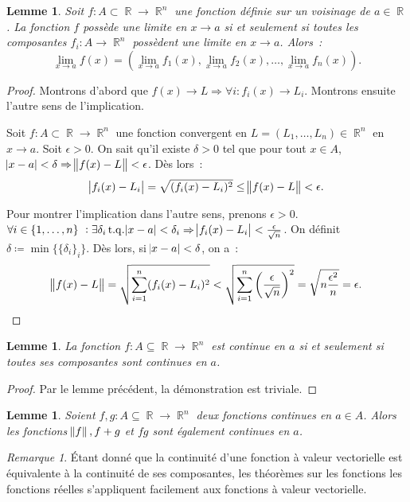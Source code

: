 \documentclass{article}
\DeclareMathOperator{\R}{\mathbb R}
\DeclareMathOperator{\tq}{ t.q. }
\newtheorem{lem}[thm]{Lemme}
\theoremstyle{definition}
\theoremstyle{remark}
\newtheorem*{rmq}{Remarque}
\begin{document}
		\begin{lem} Soit $f : A \subset \R \to \R^n$ une fonction définie sur un voisinage de $a \in \R$. La fonction $f$ possède une limite en $x \to a$ si
		et seulement si toutes les composantes $f_i : A \to \R^n$ possèdent une limite en $x \to a$. Alors~:
		\[\lim_{x \to a}f(x) = \left(\lim_{x \to a}f_1(x), \lim_{x \to a}f_2(x), \ldots, \lim_{x \to a}f_n(x)\right).\]
		\end{lem}

		\begin{proof} Montrons d'abord que $f(x) \to L \Rightarrow \forall i : f_i(x) \to L_i$. Montrons ensuite l'autre sens de l'implication.

		Soit $f : A \subset \R \to \R^n$ une fonction convergent en $L = (L_1, \ldots, L_n) \in \R^n$ en $x \to a$. Soit $\epsilon > 0$. On sait qu'il existe
		$\delta > 0$ tel que pour tout $x \in A$, $\abs{x-a} < \delta \Rightarrow \norm{f(x)-L} < \epsilon$. Dès lors~:
		\[\abs{f_i(x) - L_i} = \sqrt {(f_i(x) - L_i)^2} \leq \norm {f(x)-L} < \epsilon.\]

		Pour montrer l'implication dans l'autre sens, prenons $\epsilon > 0$. $\forall i \in \{1, \ldots, n\}~:
		\exists \delta_i \tq \abs{x-a} < \delta_i \Rightarrow \abs{f_i(x)-L_i} < \frac \epsilon{\sqrt n}$. On définit $\delta \coloneqq \min\{\{\delta_i\}_i\}$.
		Dès lors, si $\abs{x-a} < \delta$, on a~:
		\[\norm {f(x)-L} = \sqrt {\sum_{i=1}^n(f_i(x)-L_i)^2} < \sqrt {\sum_{i=1}^n\left(\frac \epsilon{\sqrt n}\right)^2} = \sqrt {n\frac {\epsilon^2}{n}} = \epsilon.\]
		\end{proof}

		\begin{lem} La fonction $f : A \subseteq \R \to \R^n$ est continue en $a$ si et seulement si toutes ses composantes sont continues en $a$. \end{lem}

		\begin{proof} Par le lemme précédent, la démonstration est triviale. \end{proof}

		\begin{lem} Soient $f, g : A \subseteq \R \to \R^n$ deux fonctions continues en $a \in A$. Alors les fonctions $\norm f, f+g$ et $fg$ sont également
		continues en $a$. \end{lem}

		\begin{rmq} Étant donné que la continuité d'une fonction à valeur vectorielle est équivalente à la continuité de ses composantes, les théorèmes sur
		les fonctions les fonctions réelles s'appliquent facilement aux fonctions à valeur vectorielle. \end{rmq}
\end{document}
